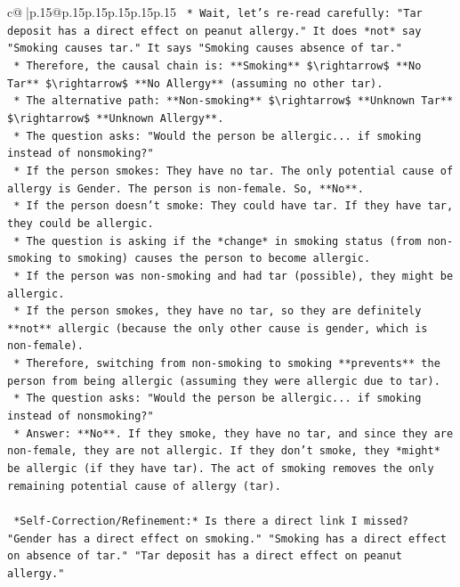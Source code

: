 \documentclass{article}
\begin{document}
{\begin{supertabular}{c@{$\;$}|p{.15\linewidth}@{}p{.15\linewidth}p{.15\linewidth}p{.15\linewidth}p{.15\linewidth}p{.15\linewidth}}
{{{\texttt{    *   Wait, let's re{-}read carefully: "Tar deposit has a direct effect on peanut allergy." It does *not* say "Smoking causes tar." It says "Smoking causes absence of tar."} \\
\texttt{    *   Therefore, the causal chain is: **Smoking** \$\textbackslash{}rightarrow\$ **No Tar** \$\textbackslash{}rightarrow\$ **No Allergy** (assuming no other tar).} \\
\texttt{    *   The alternative path: **Non{-}smoking** \$\textbackslash{}rightarrow\$ **Unknown Tar** \$\textbackslash{}rightarrow\$ **Unknown Allergy**.} \\
\texttt{    *   The question asks: "Would the person be allergic... if smoking instead of nonsmoking?"} \\
\texttt{    *   If the person smokes: They have no tar. The only potential cause of allergy is Gender. The person is non{-}female. So, **No**.} \\
\texttt{    *   If the person doesn't smoke: They could have tar. If they have tar, they could be allergic.} \\
\texttt{    *   The question is asking if the *change* in smoking status (from non{-}smoking to smoking) causes the person to become allergic.} \\
\texttt{    *   If the person was non{-}smoking and had tar (possible), they might be allergic.} \\
\texttt{    *   If the person smokes, they have no tar, so they are definitely **not** allergic (because the only other cause is gender, which is non{-}female).} \\
\texttt{    *   Therefore, switching from non{-}smoking to smoking **prevents** the person from being allergic (assuming they were allergic due to tar).} \\
\texttt{    *   The question asks: "Would the person be allergic... if smoking instead of nonsmoking?"} \\
\texttt{    *   Answer: **No**. If they smoke, they have no tar, and since they are non{-}female, they are not allergic. If they don't smoke, they *might* be allergic (if they have tar). The act of smoking removes the only remaining potential cause of allergy (tar).} \\
\\ 
\texttt{    *Self{-}Correction/Refinement:* Is there a direct link I missed? "Gender has a direct effect on smoking." "Smoking has a direct effect on absence of tar." "Tar deposit has a direct effect on peanut allergy."} \\
}}}
\end{supertabular}}
\end{document}
